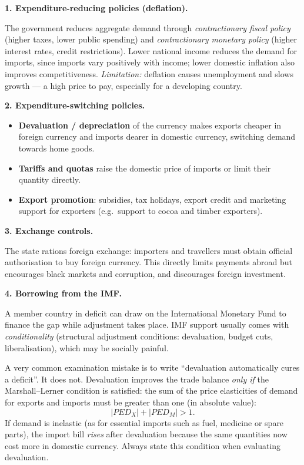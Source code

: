 \documentclass[11pt]{article}
\newcommand{\cle}[1]{{\popxbold\color{popdark}#1}}
\begin{document}
\textbf{1. Expenditure-reducing policies (deflation).}\par
The government reduces aggregate demand through \emph{contractionary fiscal policy} (higher taxes, lower public spending) and \emph{contractionary monetary policy} (higher interest rates, credit restrictions). Lower national income reduces the demand for imports, since imports vary positively with income; lower domestic inflation also improves competitiveness. \emph{Limitation:} deflation causes unemployment and slows growth --- a high price to pay, especially for a developing country.

\textbf{2. Expenditure-switching policies.}\par
\begin{itemize}
\item \textbf{Devaluation / depreciation} of the currency makes exports cheaper in foreign currency and imports dearer in domestic currency, switching demand towards home goods.
\item \textbf{Tariffs and quotas} raise the domestic price of imports or limit their quantity directly.
\item \textbf{Export promotion}: subsidies, tax holidays, export credit and marketing support for exporters (e.g.\ support to cocoa and timber exporters).
\end{itemize}

\textbf{3. Exchange controls.}\par
The state rations foreign exchange: importers and travellers must obtain official authorisation to buy foreign currency. This directly limits payments abroad but encourages black markets and corruption, and discourages foreign investment.

\textbf{4. Borrowing from the IMF.}\par
A member country in deficit can draw on the International Monetary Fund to finance the gap while adjustment takes place. IMF support usually comes with \emph{conditionality} (structural adjustment conditions: devaluation, budget cuts, liberalisation), which may be socially painful.

\begin{attention}
A very common examination mistake is to write ``devaluation automatically cures a deficit''. It does not. Devaluation improves the trade balance \emph{only if} the \cle{Marshall--Lerner condition} is satisfied: the sum of the price elasticities of demand for exports and imports must be greater than one (in absolute value):
\[
|PED_X| + |PED_M| > 1.
\]
If demand is inelastic (as for essential imports such as fuel, medicine or spare parts), the import bill \emph{rises} after devaluation because the same quantities now cost more in domestic currency. Always state this condition when evaluating devaluation.
\end{attention}
\end{document}
